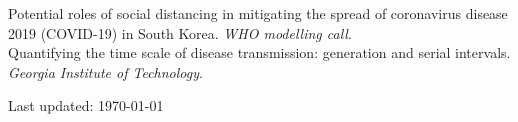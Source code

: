 \documentclass[11pt]{article} %
\begin{document}
 Potential roles of social distancing in mitigating the spread of coronavirus disease 2019 (COVID-19) in South Korea. \textit{WHO modelling call}.\\

 Quantifying the time scale of disease transmission: generation and serial intervals. \textit{Georgia Institute of Technology}.\\



\vfill %


\begin{center}
	\scriptsize
	Last updated: \today
\end{center}

\end{document}
